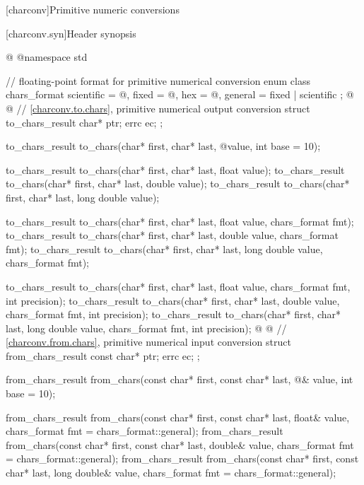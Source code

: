 [charconv]{Primitive numeric conversions}

[charconv.syn]{Header  synopsis}

%
\begin{codeblock}
@%
%
%
%
%
%
@namespace std {
  // floating-point format for primitive numerical conversion
  enum class chars_format {
    scientific = @\unspec@,
    fixed = @\unspec@,
    hex = @\unspec@,
    general = fixed | scientific
  };
@%
%
%
@
  // \ref{charconv.to.chars}, primitive numerical output conversion
  struct to_chars_result {
    char* ptr;
    errc ec;
  };

  to_chars_result to_chars(char* first, char* last, @\seebelow@ value, int base = 10);

  to_chars_result to_chars(char* first, char* last, float value);
  to_chars_result to_chars(char* first, char* last, double value);
  to_chars_result to_chars(char* first, char* last, long double value);

  to_chars_result to_chars(char* first, char* last, float value, chars_format fmt);
  to_chars_result to_chars(char* first, char* last, double value, chars_format fmt);
  to_chars_result to_chars(char* first, char* last, long double value, chars_format fmt);

  to_chars_result to_chars(char* first, char* last, float value,
                           chars_format fmt, int precision);
  to_chars_result to_chars(char* first, char* last, double value,
                           chars_format fmt, int precision);
  to_chars_result to_chars(char* first, char* last, long double value,
                           chars_format fmt, int precision);
@%
%
%
@
  // \ref{charconv.from.chars}, primitive numerical input conversion
  struct from_chars_result {
    const char* ptr;
    errc ec;
  };

  from_chars_result from_chars(const char* first, const char* last,
                               @\seebelow@& value, int base = 10);

  from_chars_result from_chars(const char* first, const char* last, float& value,
                               chars_format fmt = chars_format::general);
  from_chars_result from_chars(const char* first, const char* last, double& value,
                               chars_format fmt = chars_format::general);
  from_chars_result from_chars(const char* first, const char* last, long double& value,
                               chars_format fmt = chars_format::general);
}
\end{codeblock}

